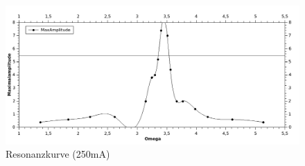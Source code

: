 \documentclass[12pt,a4paper]{article}
\begin{document}
\begin{figure}[H]
	\centering
	\includegraphics[scale=1.8]{./figure/Messung1_Resonanzkurve_250mA.png}
	\caption{Resonanzkurve (250mA)}
	\label{fig:resonanzkurve_250mA}
\end{figure}
\end{document}
